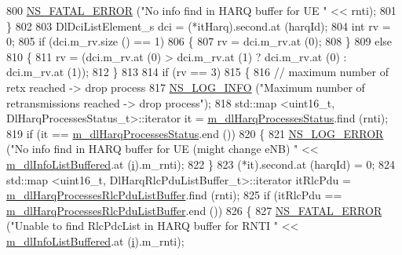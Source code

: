 \begin{DoxyCode}
800               \hyperlink{group__fatal_ga5131d5e3f75d7d4cbfd706ac456fdc85}{NS\_FATAL\_ERROR} (\textcolor{stringliteral}{"No info find in HARQ buffer for UE "} << rnti);
801             \}
802 
803           DlDciListElement\_s dci = (*itHarq).second.at (harqId);
804           \textcolor{keywordtype}{int} rv = 0;
805           \textcolor{keywordflow}{if} (dci.m\_rv.size () == 1)
806             \{
807               rv = dci.m\_rv.at (0);
808             \}
809           \textcolor{keywordflow}{else}
810             \{
811               rv = (dci.m\_rv.at (0) > dci.m\_rv.at (1) ? dci.m\_rv.at (0) : dci.m\_rv.at (1));
812             \}
813 
814           \textcolor{keywordflow}{if} (rv == 3)
815             \{
816               \textcolor{comment}{// maximum number of retx reached -> drop process}
817               \hyperlink{group__logging_gafbd73ee2cf9f26b319f49086d8e860fb}{NS\_LOG\_INFO} (\textcolor{stringliteral}{"Maximum number of retransmissions reached -> drop process"});
818               std::map <uint16\_t, DlHarqProcessesStatus\_t>::iterator it = 
      \hyperlink{classns3_1_1TdMtFfMacScheduler_a4f261a098821d6cb892196a257595cb2}{m\_dlHarqProcessesStatus}.find (rnti);
819               \textcolor{keywordflow}{if} (it == \hyperlink{classns3_1_1TdMtFfMacScheduler_a4f261a098821d6cb892196a257595cb2}{m\_dlHarqProcessesStatus}.end ())
820                 \{
821                   \hyperlink{group__logging_ga0261a8db1d4ac5f79417d117634fd455}{NS\_LOG\_ERROR} (\textcolor{stringliteral}{"No info find in HARQ buffer for UE (might change eNB) "} << 
      \hyperlink{classns3_1_1TdMtFfMacScheduler_a4237ad4223d377a1c9963a904acbe4ad}{m\_dlInfoListBuffered}.at (\hyperlink{bernuolliDistribution_8m_a6f6ccfcf58b31cb6412107d9d5281426}{i}).m\_rnti);
822                 \}
823               (*it).second.at (harqId) = 0;
824               std::map <uint16\_t, DlHarqRlcPduListBuffer\_t>::iterator itRlcPdu =  
      \hyperlink{classns3_1_1TdMtFfMacScheduler_a5c8ba74976d19c98462ea970613b644b}{m\_dlHarqProcessesRlcPduListBuffer}.find (rnti);
825               \textcolor{keywordflow}{if} (itRlcPdu == \hyperlink{classns3_1_1TdMtFfMacScheduler_a5c8ba74976d19c98462ea970613b644b}{m\_dlHarqProcessesRlcPduListBuffer}.end ())
826                 \{
827                   \hyperlink{group__fatal_ga5131d5e3f75d7d4cbfd706ac456fdc85}{NS\_FATAL\_ERROR} (\textcolor{stringliteral}{"Unable to find RlcPdcList in HARQ buffer for RNTI "} << 
      \hyperlink{classns3_1_1TdMtFfMacScheduler_a4237ad4223d377a1c9963a904acbe4ad}{m\_dlInfoListBuffered}.at (\hyperlink{bernuolliDistribution_8m_a6f6ccfcf58b31cb6412107d9d5281426}{i}).m\_rnti);

\end{DoxyCode}
